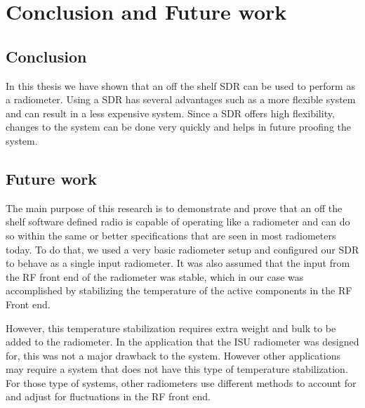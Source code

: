\chapter{Conclusion and Future work} 

\section{Conclusion}
In this thesis we have shown that an off the shelf SDR can be used to perform as a radiometer.  Using a SDR has several advantages such as a more flexible system and can result in a less expensive system.  Since a SDR offers high flexibility, changes to the system can be done very quickly and helps in future proofing the system.  

\section{Future work}
The main purpose of this research is to demonstrate and prove that an off the shelf software defined radio is capable of operating like a radiometer and can do so within the same or better specifications that are seen in most radiometers today.  To do that, we used a very basic radiometer setup and configured our SDR to behave as a single input radiometer.  It was also assumed that the input from the RF front end of the radiometer was stable, which in our case was accomplished by stabilizing the temperature of the active components in the RF Front end.

However, this temperature stabilization requires extra weight and bulk to be added to the radiometer.  In the application that the ISU radiometer was designed for, this was not a major drawback to the system.  However other applications may require a system that does not have this type of temperature stabilization.  For those type of systems, other radiometers use different methods to account for and adjust for fluctuations in the RF front end. 


